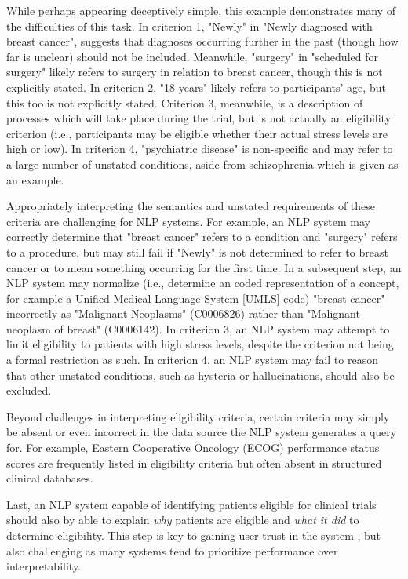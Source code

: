 \documentclass[../main.tex]{subfiles}
\begin{document}
\noindent While perhaps appearing deceptively simple, this example demonstrates many of the difficulties of this task. In criterion 1,  "Newly" in "Newly diagnosed with breast cancer", suggests that diagnoses occurring further in the past (though how far is unclear) should not be included. Meanwhile, "surgery" in "scheduled for surgery" likely refers to surgery in relation to breast cancer, though this is not explicitly stated. In criterion 2, "18 years" likely refers to participants' age, but this too is not explicitly stated. Criterion 3, meanwhile, is a description of processes which will take place during the trial, but is not actually an eligibility criterion (i.e., participants may be eligible whether their actual stress levels are high or low). In criterion 4, "psychiatric disease" is non-specific and may refer to a large number of unstated conditions, aside from schizophrenia which is given as an example.

Appropriately interpreting the semantics and unstated requirements of these criteria are challenging for NLP systems. For example, an NLP system may correctly determine that "breast cancer" refers to a condition and "surgery" refers to a procedure, but may still fail if "Newly" is not determined to refer to breast cancer or to mean something occurring for the first time. In a subsequent step, an NLP system may normalize (i.e., determine an coded representation of a concept, for example a Unified Medical Language System [UMLS] code) "breast cancer" incorrectly as "Malignant Neoplasms" (C0006826) rather than "Malignant neoplasm of breast" (C0006142). In criterion 3, an NLP system may attempt to limit eligibility to patients with high stress levels, despite the criterion not being a formal restriction as such. In criterion 4, an NLP system may fail to reason that other unstated conditions, such as hysteria or hallucinations, should also be excluded.

Beyond challenges in interpreting eligibility criteria, certain criteria may simply be absent or even incorrect in the data source the NLP system generates a query for. For example, Eastern Cooperative Oncology (ECOG) performance status scores \cite{sok2019objective} are frequently listed in eligibility criteria but often absent in structured clinical databases.

Last, an NLP system capable of identifying patients eligible for clinical trials should also by able to explain \textit{why} patients are eligible and \textit{what it did} to determine eligibility. This step is key to gaining user trust in the system \cite{lundberg2018explainable, jermutus2022influences}, but also challenging as many systems tend to prioritize performance over interpretability.
\end{document}
